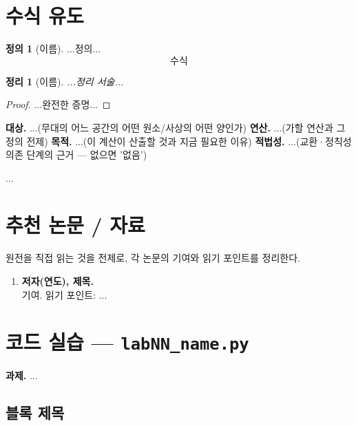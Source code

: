\documentclass[11pt]{article}
\theoremstyle{plain}
\newtheorem{theorem}{정리}
\theoremstyle{definition}
\newtheorem{definition}{정의}
\theoremstyle{remark}
\newcommand{\code}[1]{\textcolor{primary!80!black}{\texttt{#1}}}
\begin{document}
\section{수식 유도}

\begin{definition}[이름]
...정의...
\[ \text{수식} \]
\end{definition}

\begin{theorem}[이름]
...정리 서술...
\end{theorem}

\begin{proof}
...완전한 증명... \qedhere
\end{proof}

\begin{computebox}
\textbf{대상.} ...(무대의 어느 공간의 어떤 원소/사상의 어떤 양인가)\;
\textbf{연산.} ...(가할 연산과 그 정의 전제)\;
\textbf{목적.} ...(이 계산이 산출할 것과 지금 필요한 이유)\;
\textbf{적법성.} ...(교환·정칙성 의존 단계의 근거 — 없으면 '없음')
\end{computebox}

\begin{keybox}[직관]
...
\end{keybox}

\section{추천 논문 / 자료}
원전을 직접 읽는 것을 전제로, 각 논문의 기여와 읽기 포인트를 정리한다.

\begin{enumerate}[leftmargin=1.4em]
  \item \textbf{저자(연도), 제목.}\\ 기여. 읽기 포인트: ...
\end{enumerate}

\section{코드 실습 — \texorpdfstring{\code{labNN\_name.py}}{labNN\_name.py}}

\textbf{과제.}\; ...

\subsection{블록 제목}
\begin{codebox}\inputminted[firstline=27, lastline=60, firstnumber=27]{python}{labNN_name.py}\end{codebox}
\end{document}
